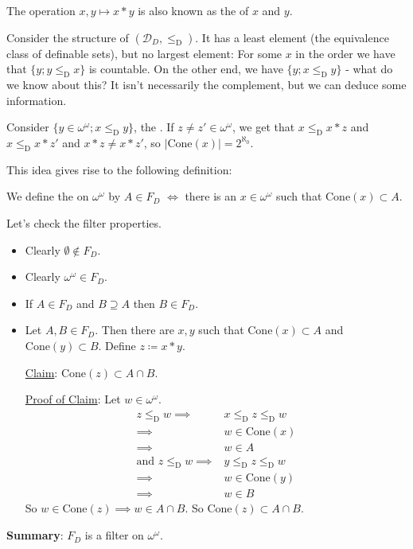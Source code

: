 \documentclass[]{article}
\newcommand{\om}{\omega}
\newcommand{\led}{\le_{\mathrm{D}}}
\newcommand{\D}{\mathcal{D}}
\newcommand{\cone}{\textrm{Cone}}
\begin{document}
The operation $x,y\mapsto x\ast y$ is also known as the  of $x$ and $y$.

Consider the structure of $(\D_D,\led)$. It has a least element (the equivalence class of definable sets), but no largest element: For some $x$ in the order we have that $\{y;y\led x\}$ is countable. On the other end, we have $\{y; x\led y\}$ - what do we know about this? It isn't necessarily the complement, but we can deduce some information.

Consider $\{y\in \om^\om;x\led y\}$, the . If $z\ne z' \in \om^\om$, we get that $x\led x\ast z$ and $x\led x\ast z'$ and $x\ast z \ne x \ast z'$, so $|\cone(x)| = 2^{\aleph_0}$.

This idea gives rise to the following definition:

\begin{defin*}
    We define the  on $\om^\om$ by $A \in F_D$ $\iff$ there is an $x \in \om^\om$ such that $\cone(x) \subset A$.

    Let's check the filter properties.

    \begin{itemize}
        \item Clearly $\emptyset \not\in F_D$.
        \item Clearly $\om^\om \in F_D$.
        \item If $A \in F_D$ and $B \supseteq A$ then $B \in F_D$.
        \item Let $A,B \in F_D$. Then there are $x,y$ such that $\cone(x) \subset A$ and $\cone(y) \subset B$. Define $z \coloneqq x \ast y$.
        
        \underline{Claim}: $\cone(z)\subset A\cap B$.

        \underline{Proof of Claim}: Let $w \in \om^\om$.
        \begin{align*}
            z\led w \implies &x\led z \led w\\
            \implies & w \in \cone(x)\\
            \implies &w \in A\\
            \textrm{and } z\led w \implies&y\led z \led w\\
            \implies & w \in \cone(y)\\
            \implies & w \in B
        \end{align*}
        So $w \in \cone(z) \implies w \in A \cap B$. So $\cone(z) \subset A\cap B$.
    \end{itemize}

    \textbf{Summary}: $F_D$ is a filter on $\om^\om$.
\end{defin*}
\end{document}
